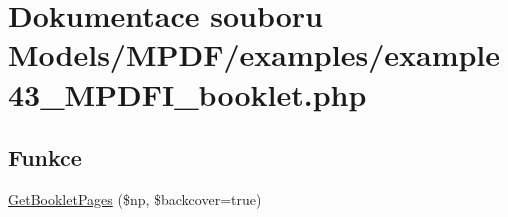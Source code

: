 \hypertarget{example43___m_p_d_f_i__booklet_8php}{\section{Dokumentace souboru Models/\-M\-P\-D\-F/examples/example43\-\_\-\-M\-P\-D\-F\-I\-\_\-booklet.php}
\label{example43___m_p_d_f_i__booklet_8php}
}
\subsection*{Funkce}
\begin{DoxyCompactItemize}
\item 
\hyperlink{example43___m_p_d_f_i__booklet_8php_a1b9720554576ed902f1b644fbdf6ce8f}{Get\-Booklet\-Pages} (\$np, \$backcover=true)
\end{DoxyCompactItemize}
